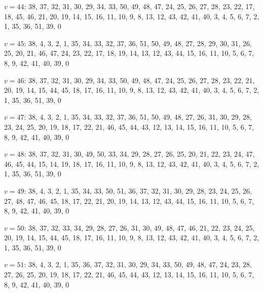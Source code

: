 \documentclass{amcjoucc}
\begin{document}
\begin{itemize}
{\item $v = 44$: 38, 37, 32, 31, 30, 29, 34, 33, 50, 49, 48, 47, 24, 25, 26, 27, 28, 23, 22, 17, 18, 45, 46, 21, 20, 19, 14, 15, 16, 11, 10, 9, 8, 13, 12, 43, 42, 41, 40, 3, 4, 5, 6, 7, 2, 1, 35, 36, 51, 39, 0
\item $v = 45$: 38, 4, 3, 2, 1, 35, 34, 33, 32, 37, 36, 51, 50, 49, 48, 27, 28, 29, 30, 31, 26, 25, 20, 21, 46, 47, 24, 23, 22, 17, 18, 19, 14, 13, 12, 43, 44, 15, 16, 11, 10, 5, 6, 7, 8, 9, 42, 41, 40, 39, 0
\item $v = 46$: 38, 37, 32, 31, 30, 29, 34, 33, 50, 49, 48, 47, 24, 25, 26, 27, 28, 23, 22, 21, 20, 19, 14, 15, 44, 45, 18, 17, 16, 11, 10, 9, 8, 13, 12, 43, 42, 41, 40, 3, 4, 5, 6, 7, 2, 1, 35, 36, 51, 39, 0
\item $v = 47$: 38, 4, 3, 2, 1, 35, 34, 33, 32, 37, 36, 51, 50, 49, 48, 27, 26, 31, 30, 29, 28, 23, 24, 25, 20, 19, 18, 17, 22, 21, 46, 45, 44, 43, 12, 13, 14, 15, 16, 11, 10, 5, 6, 7, 8, 9, 42, 41, 40, 39, 0
\item $v = 48$: 38, 37, 32, 31, 30, 49, 50, 33, 34, 29, 28, 27, 26, 25, 20, 21, 22, 23, 24, 47, 46, 45, 44, 15, 14, 19, 18, 17, 16, 11, 10, 9, 8, 13, 12, 43, 42, 41, 40, 3, 4, 5, 6, 7, 2, 1, 35, 36, 51, 39, 0
\item $v = 49$: 38, 4, 3, 2, 1, 35, 34, 33, 50, 51, 36, 37, 32, 31, 30, 29, 28, 23, 24, 25, 26, 27, 48, 47, 46, 45, 18, 17, 22, 21, 20, 19, 14, 13, 12, 43, 44, 15, 16, 11, 10, 5, 6, 7, 8, 9, 42, 41, 40, 39, 0
\item $v = 50$: 38, 37, 32, 33, 34, 29, 28, 27, 26, 31, 30, 49, 48, 47, 46, 21, 22, 23, 24, 25, 20, 19, 14, 15, 44, 45, 18, 17, 16, 11, 10, 9, 8, 13, 12, 43, 42, 41, 40, 3, 4, 5, 6, 7, 2, 1, 35, 36, 51, 39, 0
\item $v = 51$: 38, 4, 3, 2, 1, 35, 36, 37, 32, 31, 30, 29, 34, 33, 50, 49, 48, 47, 24, 23, 28, 27, 26, 25, 20, 19, 18, 17, 22, 21, 46, 45, 44, 43, 12, 13, 14, 15, 16, 11, 10, 5, 6, 7, 8, 9, 42, 41, 40, 39, 0
}
\end{itemize}
\end{document}
